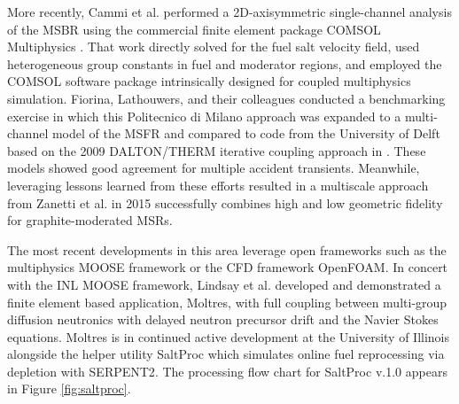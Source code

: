 More recently, Cammi et al. performed a 2D-axisymmetric single-channel analysis 
of the \gls{MSBR} using the commercial finite element package COMSOL 
Multiphysics \cite{cammi_multi-physics_2011}. That work directly solved for the 
fuel salt velocity field, used heterogeneous group constants in fuel and 
moderator regions, and employed the \gls{COMSOL} software package intrinsically 
designed for coupled multiphysics simulation.  Fiorina, Lathouwers, and their 
colleagues conducted a benchmarking exercise \cite{fiorina_modelling_2014} in 
which this Politecnico di Milano approach was expanded to a multi-channel model 
of the \gls{MSFR} and compared to code from the University of Delft 
\cite{de_zwaan_static_2007,van_der_linden_coupled_2012} based on the 
2009 DALTON/THERM iterative coupling approach in \cite{kophazi_development_2009}. 
These models showed good agreement for multiple accident transients. Meanwhile, 
leveraging lessons learned from these efforts resulted in a multiscale 
approach from Zanetti et al. in 2015 \cite{zanetti_geometric_2015} successfully 
combines high and low geometric fidelity for graphite-moderated \glspl{MSR}.

The most recent developments in this area leverage open frameworks such as 
the multiphysics \gls{MOOSE} framework \cite{gaston_physics-based_2015,gaston_parallel_2009} or 
the \gls{CFD} framework OpenFOAM\cite{weller_tensorial_1998}. In concert with the \gls{INL} \gls{MOOSE} 
framework, Lindsay et al. 
\cite{lindsay_introduction_2018,lindsay_moltres:_2018} developed and 
demonstrated a finite element based application, Moltres, with full coupling between 
multi-group diffusion neutronics with delayed neutron precursor drift and the Navier 
Stokes equations. Moltres is in continued active development \cite{huff_neutron_2018} at the 
University of Illinois alongside the helper utility SaltProc 
\cite{rykhlevskii_modeling_2018,rykhlevskii_online_2017} which simulates online fuel reprocessing via 
depletion with SERPENT2\cite{leppanen_serpent_2015}. The 
processing flow chart for SaltProc v.1.0 appears in Figure \ref{fig:saltproc}.

